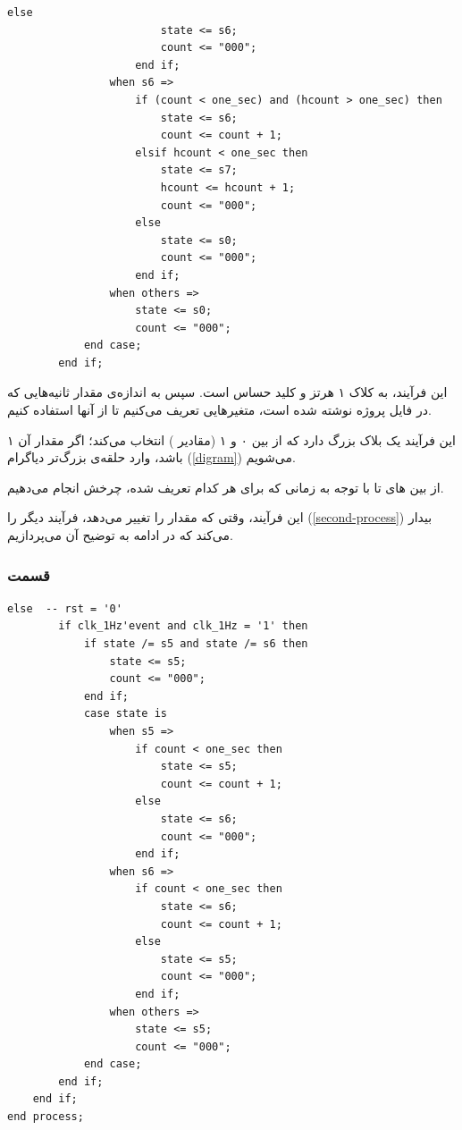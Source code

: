 \documentclass[dvipsnames, svgnames, x11names, a4paper, 11pt]{article}
\begin{document}
\begin{latin}
\begin{lstlisting}[firstnumber=29]
                    else
                        state <= s6;
                        count <= "000";
                    end if;
                when s6 =>
                    if (count < one_sec) and (hcount > one_sec) then
                        state <= s6;
                        count <= count + 1;
                    elsif hcount < one_sec then
                        state <= s7;
                        hcount <= hcount + 1;
                        count <= "000";
                    else
                        state <= s0;
                        count <= "000";
                    end if;
                when others =>
                    state <= s0;
                    count <= "000";
            end case;
        end if;
\end{lstlisting}
\end{latin}

این فرآیند، به کلاک ۱ هرتز و کلید  حساس است. سپس به اندازه‌ی مقدار ثانیه‌هایی که در فایل پروژه نوشته شده است، متغیر‌هایی تعریف می‌کنیم تا از آنها استفاده کنیم.

این فرآیند یک بلاک  بزرگ دارد که از بین ۰ و ۱ (مقادیر ) انتخاب می‌کند؛ اگر مقدار آن ۱ باشد، وارد حلقه‌ی بزرگ‌‌تر دیاگرام (\ref{digram}) می‌شویم.

از بین 
های
تا
با توجه به زمانی که برای هر کدام تعریف شده، چرخش انجام می‌دهیم.

این فرآیند، وقتی که مقدار 
را تغییر می‌دهد، فرآیند دیگر را (\ref{second-process}) بیدار می‌کند که در ادامه به توضیح آن می‌پردازیم.

\newpage
\subsubsection{قسمت }
\begin{latin}
\begin{lstlisting}[firstnumber=101]
    else  -- rst = '0'
        if clk_1Hz'event and clk_1Hz = '1' then
			if state /= s5 and state /= s6 then
				state <= s5;
				count <= "000";
			end if;
			case state is
				when s5 =>
					if count < one_sec then
						state <= s5;
						count <= count + 1;
					else
						state <= s6;
						count <= "000";
					end if;
				when s6 =>
					if count < one_sec then
						state <= s6;
						count <= count + 1;
					else
						state <= s5;
						count <= "000";
					end if;
				when others =>
					state <= s5;
					count <= "000";
            end case;
        end if;
    end if;
end process;
\end{lstlisting}
\end{latin}
\end{document}
